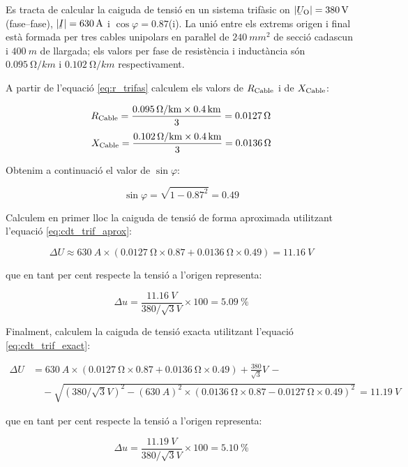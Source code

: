 \begin{exemple}
       Es tracta de calcular la caiguda de tensió en un sistema trifàsic on $|\cmplx{U}\ped{O}| = \SI{380}{V}$ (fase--fase), $|\cmplx{I}|=\SI{630}{A}$ i $\cos \varphi = \num{0,87}$(i). La unió entre els extrems origen  i final està formada per tres cables unipolars en paraŀlel de $\SI{240}{mm^2}$ de secció cadascun i $\SI{400}{m}$ de llargada; els valors per fase de resistència i inductància són $\SI{0,095}{\ohm/km}$ i $\SI{0,102}{\ohm/km}$ respectivament.

    A partir de l'equació \eqref{eq:r_trifas} calculem els valors de $R_\mathrm{Cable}$ i de $X_\mathrm{Cable}$:

    \[
       R_\mathrm{Cable} = \frac{\SI{0,095}{\ensuremath{\mathrm{\Omega}}/km}\times \SI{0,4}{km}}{3} = \SI{0,0127}{\ensuremath{\mathrm{\Omega}}}
    \]
    \[
       X_\mathrm{Cable} = \frac{\SI{0,102}{\ensuremath{\mathrm{\Omega}}/km}\times \SI{0,4}{km}}{3} = \SI{0,0136}{\ensuremath{\mathrm{\Omega}}}
    \]

    Obtenim a continuació el valor de $\sin \varphi$:

    \[
       \sin \varphi = \sqrt{1-\num{0,87}^2} = \num{0,49}
    \]

    Calculem en primer lloc la caiguda de tensió de forma aproximada utilitzant l'equació \eqref{eq:cdt_trif_aprox}:

    \[
       \Delta U \approx \SI{630}{A} \times ( \SI{0,0127}{\ohm} \times \num{0,87} + \SI{0,0136}{\ohm} \times \num{0,49} ) = \SI{11,16}{V}
    \]

    que en tant per cent respecte la tensió a l'origen representa:

    \[
        \Delta u = \frac{\SI{11,16}{V}}{380/\sqrt{3}\unit{V}} \times 100 = \SI{5,09}{\%}
    \]

    Finalment, calculem la caiguda de tensió exacta utilitzant l'equació \eqref{eq:cdt_trif_exact}:

    \[ \begin{split}
       \Delta U &=  \SI{630}{A} \times( \SI{0,0127}{\ohm} \times \num{0,87} + \SI{0,0136}{\ohm} \times \num{0,49}) + \frac{380}{\sqrt{3}}\unit{V} \,- \\
        & \quad - \sqrt{\left(380/\sqrt{3}\unit{V}\right)^2 - \left(\SI{630}{A}\right)^2 \times  \left( \SI{0,0136}{\ohm} \times \num{0,87} - \SI{0,0127}{\ohm} \times \num{0,49} \right)^2 } \,= \SI{11,19}{V}
    \end{split} \]

    que en tant per cent respecte la tensió a l'origen representa:

    \[
        \Delta u = \frac{\SI{11,19}{V}}{380/\sqrt{3}\unit{V}} \times 100 = \SI{5,10}{\%}
    \]
\end{exemple}

